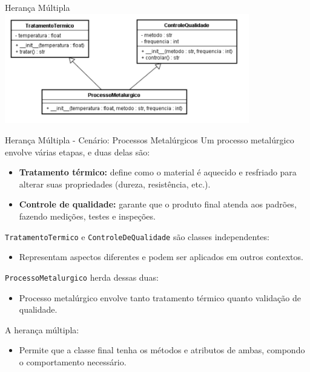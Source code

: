 \begin{frame}{Herança Múltipla}
    \centering
    \includegraphics[width=0.8\textwidth]{Images/heranca-multipla.png}
\end{frame}

\begin{frame}{Herança Múltipla - Cenário: Processos Metalúrgicos}
    Um processo metalúrgico envolve várias etapas, e duas delas são:

    \begin{itemize}
        \item \textbf{Tratamento térmico:} define como o material é aquecido e resfriado para alterar suas propriedades (dureza, resistência, etc.).
        \item \textbf{Controle de qualidade:} garante que o produto final atenda aos padrões, fazendo medições, testes e inspeções.
    \end{itemize}


    \texttt{TratamentoTermico} e \texttt{ControleDeQualidade} são classes independentes:
    \begin{itemize}
        \item Representam aspectos diferentes e podem ser aplicados em outros contextos.
    \end{itemize}


    \texttt{ProcessoMetalurgico} herda dessas duas:
    \begin{itemize}
        \item Processo metalúrgico envolve tanto tratamento térmico quanto validação de qualidade.
    \end{itemize}


    A herança múltipla:
    \begin{itemize}
        \item Permite que a classe final tenha os métodos e atributos de ambas, compondo o comportamento necessário.
    \end{itemize}
\end{frame}


